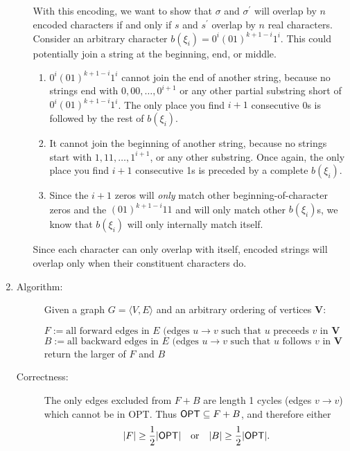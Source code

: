 \documentclass{article}
\def\prm{^\prime}
\def\O{{\sf OPT}\xspace}
\begin{document}
\begin{enumerate}
\begin{enumerate}
With this encoding, we want to show that $\sigma$ and $\sigma\prm$ will overlap by $n$ encoded characters if and only if $s$ and $s\prm$ overlap by $n$ real characters. Consider an arbitrary character $b(\xi_i) = 0^i (01)^{k+1-i} 1^i$. This could potentially join a string at the beginning, end, or middle.
\begin{enumerate}
	\item $0^i(01)^{k+1-i}1^i$ cannot join the end of another string, because no strings end with $0, 00, \ldots, 0^{i+1}$ or any other partial substring short of $0^i (01)^{k+1-i} 1^i$. The only place you find $i+1$ consecutive 0s is followed by the rest of $b(\xi_i)$.
	\item It cannot join the beginning of another string, because no strings start with $1, 11, \ldots, 1^{i+1}$, or any other substring. Once again, the only place you find $i+1$ consecutive 1s is preceded by a complete $b(\xi_i)$.
	\item Since the $i+1$ zeros will {\it only} match other beginning-of-character zeros and the $(01)^{k+1-i}11$ and will only match other $b(\xi_i)$s, we know that $b(\xi_i)$ will only internally match itself.
\end{enumerate}
Since each character can only overlap with itself, encoded strings will overlap only when their constituent characters do.

\end{enumerate}


\newpage
\item
\begin{description}

\item[Algorithm:]
Given a graph $G = \langle V, E \rangle$ and an arbitrary ordering of vertices $\mathbf{V}$:
\begin{code}
$F := \text{all forward edges in $E$ (edges $u\rightarrow{}v$ such that $u$ preceeds $v$ in $\mathbf{V}$}$
$B := \text{all backward edges in $E$ (edges $u\rightarrow{}v$ such that $u$ follows $v$ in $\mathbf{V}$}$
return the larger of $F$ and $B$
\end{code}

\item[Correctness:]
The only edges excluded from $F + B$ are length 1 cycles (edges $v \rightarrow v$) which cannot be in \O. Thus $\O \subseteq F + B$, and therefore either
$$|F| \geq \frac{1}{2} |\O| \hspace{1em} \text{or} \hspace{1em} |B| \geq \frac{1}{2} |\O|.$$


\end{description}
\end{enumerate}
\end{document}
